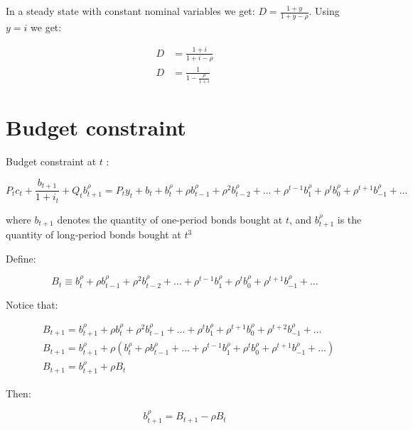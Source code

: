 \documentclass[10pt]{article}
\begin{document}
In a steady state with constant nominal variables we get: $D=\frac{1+y}{1+y-\rho}$. Using $y=i$ we get:

\begin{equation*}
\begin{aligned}
D & =\frac{1+i}{1+i-\rho} \\
D & =\frac{1}{1-\frac{\rho}{1+i}}
\end{aligned}
\end{equation*}

\section*{Budget constraint}
Budget constraint at $t$ :

\begin{equation*}
P_{t} c_{t}+\frac{b_{t+1}}{1+i_{t}}+Q_{t} b_{t+1}^{\rho}=P_{t} y_{t}+b_{t}+b_{t}^{\rho}+\rho b_{t-1}^{\rho}+\rho^{2} b_{t-2}^{\rho}+\ldots+\rho^{t-1} b_{1}^{\rho}+\rho^{t} b_{0}^{\rho}+\rho^{t+1} b_{-1}^{\rho}+\ldots
\end{equation*}

where $b_{t+1}$ denotes the quantity of one-period bonds bought at $t$, and $b_{t+1}^{\rho}$ is the quantity of long-period bonds bought at $t{ }^{3}$

Define:

\begin{equation*}
B_{t} \equiv b_{t}^{\rho}+\rho b_{t-1}^{\rho}+\rho^{2} b_{t-2}^{\rho}+\ldots+\rho^{t-1} b_{1}^{\rho}+\rho^{t} b_{0}^{\rho}+\rho^{t+1} b_{-1}^{\rho}+\ldots
\end{equation*}

Notice that:

\begin{equation*}
\begin{aligned}
& B_{t+1}=b_{t+1}^{\rho}+\rho b_{t}^{\rho}+\rho^{2} b_{t-1}^{\rho}+\ldots+\rho^{t} b_{1}^{\rho}+\rho^{t+1} b_{0}^{\rho}+\rho^{t+2} b_{-1}^{\rho}+\ldots \\
& B_{t+1}=b_{t+1}^{\rho}+\rho\left(b_{t}^{\rho}+\rho b_{t-1}^{\rho}+\ldots+\rho^{t-1} b_{1}^{\rho}+\rho^{t} b_{0}^{\rho}+\rho^{t+1} b_{-1}^{\rho}+\ldots\right) \\
& B_{t+1}=b_{t+1}^{\rho}+\rho B_{t}
\end{aligned}
\end{equation*}

Then:

\begin{equation*}
b_{t+1}^{\rho}=B_{t+1}-\rho B_{t}
\end{equation*}
\end{document}
